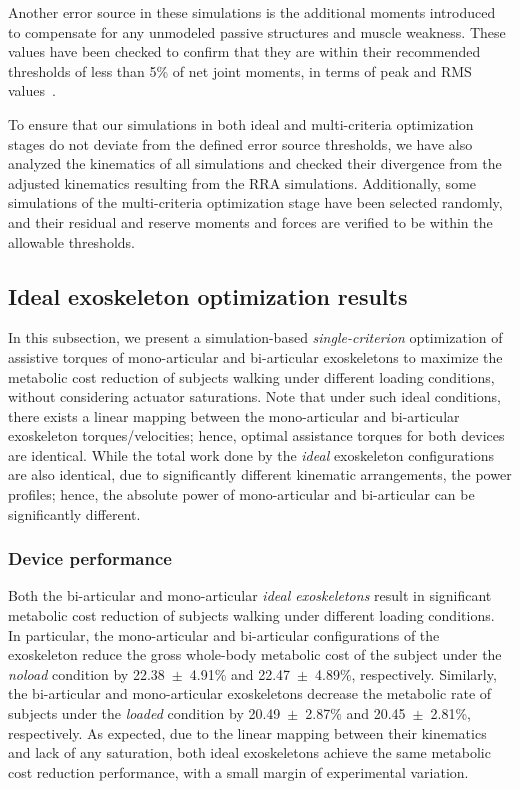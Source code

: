\documentclass[10pt,letterpaper]{article}
\begin{document}
Another error source in these simulations is the additional moments introduced to compensate for any unmodeled passive structures and muscle weakness. These values have been checked to confirm that they are within their recommended thresholds of less than 5\% of net joint moments, in terms of peak and RMS values~\cite{Dembia2017}.

To ensure that our simulations in both ideal and multi-criteria optimization stages do not deviate from the defined error source thresholds, we have also analyzed the kinematics of all simulations and checked their divergence from the adjusted kinematics resulting from the RRA simulations. Additionally, some simulations of the multi-criteria optimization stage have been selected randomly, and their residual and reserve moments and forces are verified to be within the allowable thresholds.


\subsection*{Ideal exoskeleton optimization results}

In this subsection, we present a simulation-based \emph{single-criterion} optimization of assistive torques of mono-articular and bi-articular exoskeletons to maximize the metabolic cost reduction of subjects walking under different loading conditions, without considering actuator saturations. Note that under such ideal conditions, there exists a linear mapping between the mono-articular and bi-articular exoskeleton torques/velocities; hence, optimal assistance torques for both devices are identical. While the total work done by the \emph{ideal} exoskeleton configurations are also identical, due to significantly different kinematic arrangements, the power profiles; hence, the absolute power of mono-articular and bi-articular can be significantly different.


\subsubsection*{Device performance}

Both the bi-articular and mono-articular \emph{ideal exoskeletons} result in significant metabolic cost reduction of subjects walking under different loading conditions. In particular, the mono-articular and bi-articular configurations of the exoskeleton reduce the gross whole-body metabolic cost of the subject under the \textit{noload} condition by 22.38~$\pm$~4.91\% and 22.47~$\pm$~4.89\%, respectively. Similarly, the bi-articular and mono-articular exoskeletons decrease the metabolic rate of subjects under the \textit{loaded} condition by 20.49~$\pm$~2.87\% and 20.45~$\pm$~2.81\%, respectively.  As expected, due to the linear mapping between their kinematics and lack of any saturation, both ideal exoskeletons achieve the same metabolic cost reduction performance, with a small margin of experimental variation.
\end{document}
